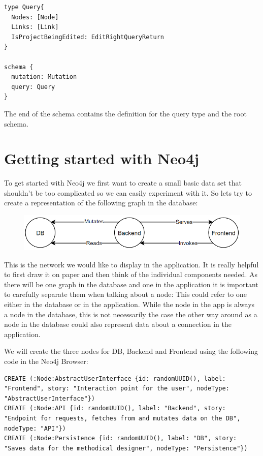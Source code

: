 \begin{lstlisting}[caption={Root Type Definitions}]
type Query{
  Nodes: [Node]
  Links: [Link]
  IsProjectBeingEdited: EditRightQueryReturn
}

schema {
  mutation: Mutation
  query: Query
}
\end{lstlisting}

The end of the schema contains the definition for the query type and the root schema.

\section{Getting started with Neo4j}
To get started with Neo4j we first want to create a small basic data set that shouldn't be too complicated so we can easily experiment with it. So lets try to create a representation of the following graph in the database:

\begin{figure}[H]
\centering
\includegraphics[scale=.8]{Bilder/BasicGraph.png}
\label{ex421}
\end{figure}

This is the network we would like to display in the application. It is really helpful to first draw it on paper and then think of the individual components needed. As there will be one graph in the database and one in the application it is important to carefully separate them when talking about a node: This could refer to one either in the database or in the application. While the node in the app is always a node in the database, this is not necessarily the case the other way around as a node in the database could also represent data about a connection in the application.

We will create the three nodes for DB, Backend and Frontend using the following code in the Neo4j Browser:
\lstset{language=Cypher}
\begin{lstlisting}[caption={Cypher Statements to Create the Nodes}]
CREATE (:Node:AbstractUserInterface {id: randomUUID(), label: "Frontend", story: "Interaction point for the user", nodeType: "AbstractUserInterface"})
CREATE (:Node:API {id: randomUUID(), label: "Backend", story: "Endpoint for requests, fetches from and mutates data on the DB", nodeType: "API"})
CREATE (:Node:Persistence {id: randomUUID(), label: "DB", story: "Saves data for the methodical designer", nodeType: "Persistence"})
\end{lstlisting}

